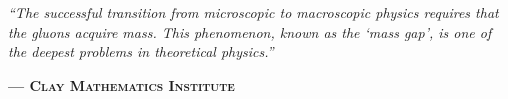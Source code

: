 \documentclass[12pt,a4paper,twoside]{article}
\theoremstyle{plain}
\theoremstyle{definition}
\theoremstyle{remark}
\begin{document}
\noindent
\begin{tcolorbox}[
    enhanced, colback=gray!6, frame hidden, boxrule=0pt, arc=1pt,
    drop shadow={opacity=0.04, shadow xshift=1.5pt, shadow yshift=1.5pt},
    left=20pt, right=20pt, top=12pt, bottom=12pt,
    fontupper=\rmfamily, nobeforeafter
]
    \makebox[l]{\hspace{-0.8em}\raisebox{-0.3em}{\textcolor{gray!20}{\fontsize{5em}{0}\selectfont $\Omega$}}}%
    \hspace{2.5em}%
    \begin{minipage}{\dimexpr\linewidth-3em}
        \itshape \color{dimgray}
        \setlength{\parskip}{0.3em}
        \large
        ``The successful transition from microscopic to macroscopic physics requires that the gluons acquire mass. This phenomenon, known as the `mass gap', is one of the deepest problems in theoretical physics.''
        \par\vspace{0.4em}
        \hfill \footnotesize \upshape\textsc{\textbf{--- Clay Mathematics Institute}}
    \end{minipage}
\end{tcolorbox}

\vspace{0.4cm}
\end{document}
